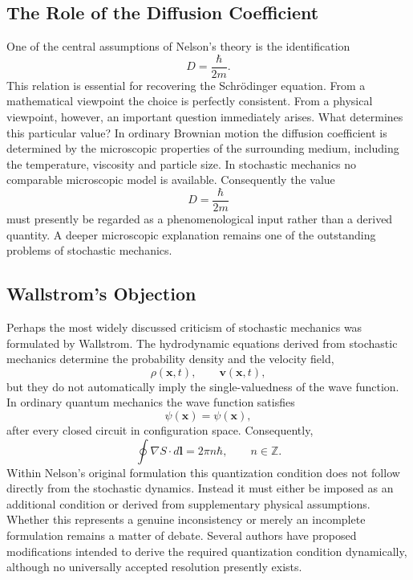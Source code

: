 \subsection{The Role of the Diffusion Coefficient}
One of the central assumptions of Nelson's theory is the identification
\[D=\frac{\hbar}{2m}.\]
This relation is essential for recovering the Schrödinger equation.
From a mathematical viewpoint the choice is perfectly consistent.
From a physical viewpoint, however, an important question immediately
arises.
What determines this particular value?
In ordinary Brownian motion the diffusion coefficient is determined by
the microscopic properties of the surrounding medium, including the
temperature, viscosity and particle size.
In stochastic mechanics no comparable microscopic model is available.
Consequently the value
\[D=\frac{\hbar}{2m}\]
must presently be regarded as a phenomenological input rather than a
derived quantity.
A deeper microscopic explanation remains one of the outstanding problems
of stochastic mechanics.
\subsection{Wallstrom's Objection}
Perhaps the most widely discussed criticism of stochastic mechanics was
formulated by Wallstrom.
The hydrodynamic equations derived from stochastic mechanics determine
the probability density and the velocity field,
\[\rho(\mathbf x,t),\qquad\mathbf v(\mathbf x,t),\]
but they do not automatically imply the single-valuedness of the wave
function.
In ordinary quantum mechanics the wave function satisfies
\[\psi(\mathbf x)=\psi(\mathbf x),\]
after every closed circuit in configuration space.
Consequently,
\[\oint\nabla S\cdot d\mathbf l=2\pi n\hbar,\qquad n\in\mathbb Z.\]
Within Nelson's original formulation this quantization condition does
not follow directly from the stochastic dynamics.
Instead it must either be imposed as an additional condition or derived
from supplementary physical assumptions.
Whether this represents a genuine inconsistency or merely an incomplete
formulation remains a matter of debate.
Several authors have proposed modifications intended to derive the
required quantization condition dynamically, although no universally
accepted resolution presently exists.

